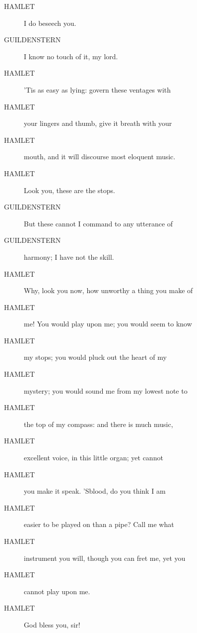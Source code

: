 \documentclass{article}
\begin{document}
\begin{description}
            
\item[HAMLET] I do beseech you.
\end{description}
          
\begin{description}
            
\item[GUILDENSTERN] I know no touch of it, my lord.
\end{description}
          
\begin{description}
            
\item[HAMLET] 'Tis as easy as lying: govern these ventages with
\item[HAMLET] your lingers and thumb, give it breath with your
\item[HAMLET] mouth, and it will discourse most eloquent music.
\item[HAMLET] Look you, these are the stops.
\end{description}
          
\begin{description}
            
\item[GUILDENSTERN] But these cannot I command to any utterance of
\item[GUILDENSTERN] harmony; I have not the skill.
\end{description}
          
\begin{description}
            
\item[HAMLET] Why, look you now, how unworthy a thing you make of
\item[HAMLET] me! You would play upon me; you would seem to know
\item[HAMLET] my stops; you would pluck out the heart of my
\item[HAMLET] mystery; you would sound me from my lowest note to
\item[HAMLET] the top of my compass: and there is much music,
\item[HAMLET] excellent voice, in this little organ; yet cannot
\item[HAMLET] you make it speak. 'Sblood, do you think I am
\item[HAMLET] easier to be played on than a pipe? Call me what
\item[HAMLET] instrument you will, though you can fret me, yet you
\item[HAMLET] cannot play upon me.
\item[HAMLET] God bless you, sir!
\end{description}
          
\end{document}
